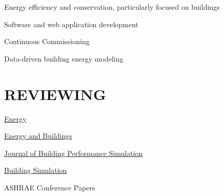 \documentclass[margin]{res} %
\begin{document}
\begin{resume}
Energy efficiency and conservation, particularly focused on buildings

Software and web application development

Continuous Commissioning\textsuperscript{\textregistered{}}

Data-driven building energy modeling

\section{REVIEWING}

\href{https://www.sciencedirect.com/journal/energy}{Energy}

\href{https://www.sciencedirect.com/journal/energy-and-buildings}{Energy and Buildings}


\href{https://www.tandfonline.com/journals/tbps20}{Journal of Building Performance Simulation}

\href{https://www.springer.com/journal/12273}{Building Simulation}

ASHRAE Conference Papers

\end{resume}
% 
\end{document}
